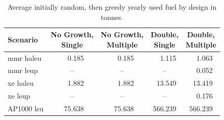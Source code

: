   \begin{table}[H]
    \centering
    \caption{Average initially random, then greedy yearly used fuel by design in tonnes.}
    \label{tab:rand_greed_used_avg}
    \begin{tabular}{l c c c c}
       \toprule
       Scenario & \shortstack{No Growth,\\ Single} & \shortstack{No Growth,\\ Multiple} & \shortstack{Double,\\ Single} & \shortstack{Double,\\ Multiple}  \\
       \midrule
       \gls{mmr} \gls{haleu}   & \textcolor{white}{00}0.185    & \textcolor{white}{00}0.185   & \textcolor{white}{00}1.115    & \textcolor{white}{00}1.063    \\
       \gls{mmr} \gls{leup}    & --       & --      & --       & \textcolor{white}{00}0.052    \\
       \gls{xe} \gls{haleu}    & \textcolor{white}{00}1.882    & \textcolor{white}{00}1.882   & \textcolor{white}{0}13.549   & \textcolor{white}{0}13.419   \\
       \gls{xe} \gls{leup}     & --       & --      & --       & \textcolor{white}{00}0.176    \\
       AP1000 \gls{leu}        & \textcolor{white}{0}75.638   & \textcolor{white}{0}75.638  & 566.239  & 566.239  \\
       \bottomrule
    \end{tabular}
  \end{table}
  
